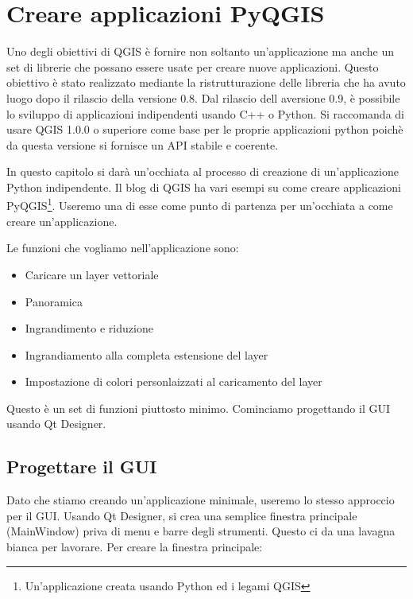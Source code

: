 
\section{Creare applicazioni PyQGIS}


Uno degli obiettivi di QGIS è fornire non soltanto un'applicazione ma anche un set di librerie che possano essere usate per creare nuove applicazioni. Questo obiettivo è stato realizzato mediante la ristrutturazione delle libreria che ha avuto luogo dopo il rilascio della versione 0.8. Dal rilascio dell aversione 0.9, è possibile lo sviluppo di applicazioni indipendenti usando C++ o Python. Si raccomanda di usare QGIS 1.0.0 o superiore come base per le proprie applicazioni python poichè da questa versione si fornisce un API stabile e coerente.

In questo capitolo si darà un'occhiata al processo di creazione di un'applicazione Python indipendente. Il blog di QGIS ha vari esempi su come creare applicazioni PyQGIS\footnote{Un'applicazione creata usando Python ed i legami QGIS}. Useremo una di esse come punto di partenza per un'occhiata a come creare un'applicazione.

Le funzioni che vogliamo nell'applicazione sono:

\begin{itemize}
\item Caricare un layer vettoriale
\item Panoramica
\item Ingrandimento e riduzione
\item Ingrandiamento alla completa estensione del layer
\item Impostazione di colori personlaizzati al caricamento del layer
\end{itemize} 

Questo è un set di funzioni piuttosto minimo. Cominciamo progettando il GUI usando Qt Designer.

\subsection{Progettare il GUI}

Dato che stiamo creando un'applicazione minimale, useremo lo stesso approccio per il GUI. Usando Qt Designer, si crea una semplice finestra principale (MainWindow) priva di menu e barre degli strumenti. Questo ci da una lavagna bianca per lavorare. Per creare la finestra principale:

